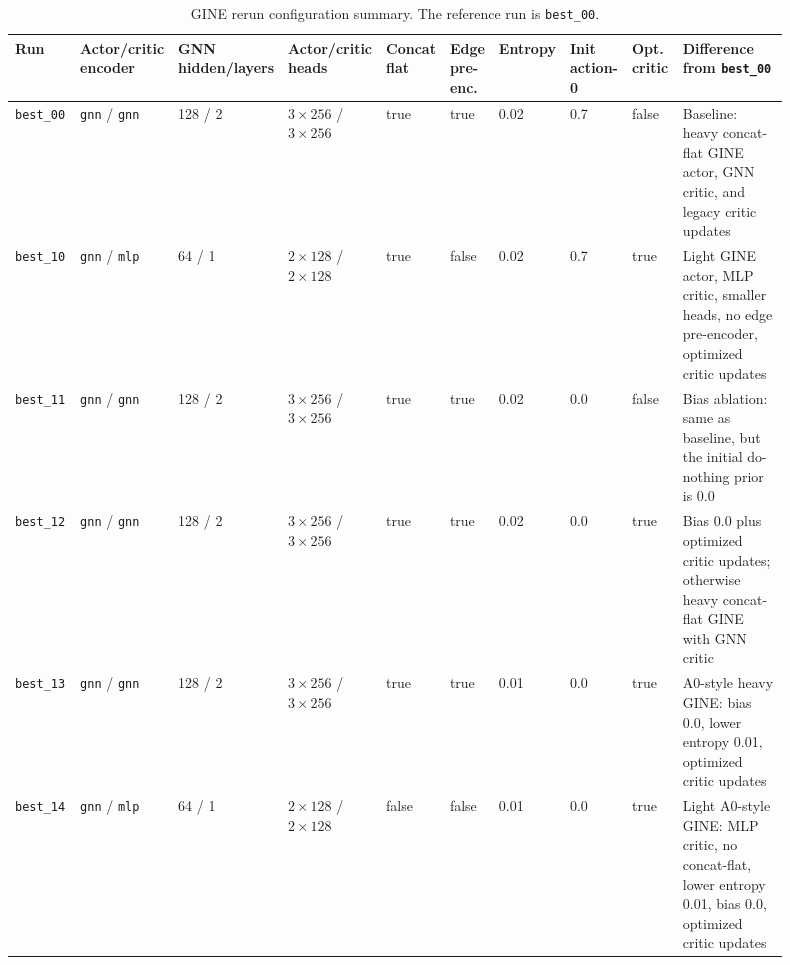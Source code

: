 \begin{landscape}
\begin{table}[p]
  \centering
  \scriptsize
  \caption{GINE rerun configuration summary. The reference run is
  \texttt{best\_00}.}
  \label{tab:gine-run-configurations}
  \setlength{\tabcolsep}{2.4pt}
  \renewcommand{\arraystretch}{1.12}
  \begin{tabular}{L{0.095\linewidth}L{0.075\linewidth}L{0.065\linewidth}L{0.095\linewidth}L{0.050\linewidth}L{0.060\linewidth}L{0.050\linewidth}L{0.065\linewidth}L{0.070\linewidth}L{0.275\linewidth}}
    \toprule
    Run & Actor/critic encoder & GNN hidden/layers & Actor/critic heads &
    Concat flat & Edge pre-enc. & Entropy & Init action-0 & Opt. critic &
    Difference from \texttt{best\_00} \\
    \midrule
    \texttt{best\_00} & \texttt{gnn} / \texttt{gnn} & 128 / 2 &
    \(3\times256\) / \(3\times256\) & true & true & 0.02 & 0.7 & false &
    Baseline: heavy concat-flat GINE actor, GNN critic, and legacy critic updates \\
    \texttt{best\_10} & \texttt{gnn} / \texttt{mlp} & 64 / 1 &
    \(2\times128\) / \(2\times128\) & true & false & 0.02 & 0.7 & true &
    Light GINE actor, MLP critic, smaller heads, no edge pre-encoder, optimized critic updates \\
    \texttt{best\_11} & \texttt{gnn} / \texttt{gnn} & 128 / 2 &
    \(3\times256\) / \(3\times256\) & true & true & 0.02 & 0.0 & false &
    Bias ablation: same as baseline, but the initial do-nothing prior is 0.0 \\
    \texttt{best\_12} & \texttt{gnn} / \texttt{gnn} & 128 / 2 &
    \(3\times256\) / \(3\times256\) & true & true & 0.02 & 0.0 & true &
    Bias 0.0 plus optimized critic updates; otherwise heavy concat-flat GINE with GNN critic \\
    \texttt{best\_13} & \texttt{gnn} / \texttt{gnn} & 128 / 2 &
    \(3\times256\) / \(3\times256\) & true & true & 0.01 & 0.0 & true &
    A0-style heavy GINE: bias 0.0, lower entropy 0.01, optimized critic updates \\
    \texttt{best\_14} & \texttt{gnn} / \texttt{mlp} & 64 / 1 &
    \(2\times128\) / \(2\times128\) & false & false & 0.01 & 0.0 & true &
    Light A0-style GINE: MLP critic, no concat-flat, lower entropy 0.01, bias 0.0, optimized critic updates \\
    \bottomrule
  \end{tabular}
\end{table}
\end{landscape}

